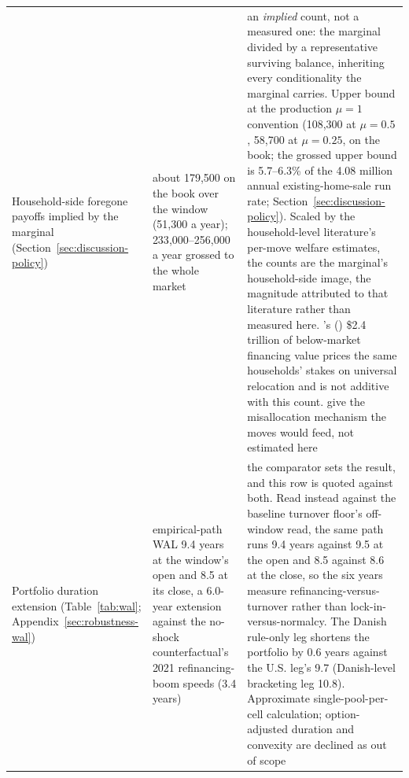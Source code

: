 \documentclass[12pt]{article}
\newcommand{\citepos}[1]{\citeauthor{#1}'s (\citeyear{#1})}
\begin{document}
{\begin{longtable}{@{}p{4.6cm}p{4.6cm}p{5.3cm}@{}}
\addlinespace
Household-side foregone payoffs implied by the marginal (Section~\ref{sec:discussion-policy}) & about 179{,}500 on the book over the window (51{,}300 a year); 233{,}000--256{,}000 a year grossed to the whole market & an \emph{implied} count, not a measured one: the marginal divided by a representative surviving balance, inheriting every conditionality the marginal carries. Upper bound at the production $\mu = 1$ convention (108{,}300 at $\mu = 0.5$, 58{,}700 at $\mu = 0.25$, on the book; the grossed upper bound is 5.7--6.3\% of the 4.08 million annual existing-home-sale run rate; Section~\ref{sec:discussion-policy}). Scaled by the household-level literature's per-move welfare estimates, the counts are the marginal's household-side image, the magnitude attributed to that literature \citep{gerardi2024} rather than measured here. \citepos{batzer2024} \$2.4 trillion of below-market financing value prices the same households' stakes on universal relocation and is not additive with this count. \citet{hsieh2019} give the misallocation mechanism the moves would feed, not estimated here \\
\addlinespace
Portfolio duration extension (Table~\ref{tab:wal}; Appendix~\ref{sec:robustness-wal}) & empirical-path WAL 9.4 years at the window's open and 8.5 at its close, a 6.0-year extension against the no-shock counterfactual's 2021 refinancing-boom speeds (3.4 years) & the comparator sets the result, and this row is quoted against both. Read instead against the baseline turnover floor's off-window read, the same path runs 9.4 years against 9.5 at the open and 8.5 against 8.6 at the close, so the six years measure refinancing-versus-turnover rather than lock-in-versus-normalcy. The Danish rule-only leg shortens the portfolio by 0.6 years against the U.S. leg's 9.7 (Danish-level bracketing leg 10.8). Approximate single-pool-per-cell calculation; option-adjusted duration and convexity are declined as out of scope \\
\bottomrule
\end{longtable}
}

\end{document}
